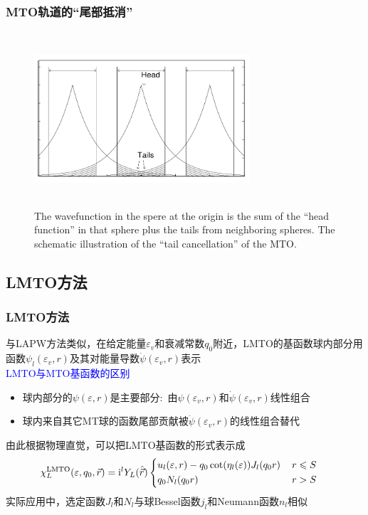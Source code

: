 {\frame
{
	\frametitle{\textrm{MTO}轨道的“尾部抵消”}
\begin{figure}[h!]
	\vspace*{-0.7in}
\centering
\includegraphics[height=2.55in,width=3.15in,viewport=0 0 845 635,clip]{Figures/MTO-Tail_cancellation.png}
\caption{\tiny \textrm{The wavefunction in the spere at the origin is the sum of the ``head function'' in that sphere plus the tails from neighboring spheres. The schematic illustration of the ``tail cancellation'' of the MTO.}}%
\label{MTO-tail-candellation}
\end{figure}
}

\subsection{\rm{LMTO}方法}
\frame
{
	\frametitle{\textrm{LMTO}方法}
	与\textrm{LAPW}方法类似，在给定能量$\varepsilon_v$和衰减常数$q_0$附近，\textrm{LMTO}的基函数球内部分用函数$\psi_l(\varepsilon_v,r)$及其对能量导数$\dot\psi(\varepsilon_v,r)$表示\\
\textcolor{blue}{\textrm{LMTO}与\textrm{MTO}基函数的区别}
	\begin{itemize}
		\item 球内部分的$\psi(\varepsilon,r)$是主要部分:~由$\psi(\varepsilon_v,r)$和$\dot\psi(\varepsilon_v,r)$线性组合
		\item 球内来自其它\textrm{MT}球的函数尾部贡献被$\dot\psi(\varepsilon_v,r)$的线性组合替代
	\end{itemize}
	由此根据物理直觉，可以把\textrm{LMTO}基函数的形式表示成
		\begin{displaymath}
			\hspace*{-12pt}\chi_L^{\mathrm{LMTO}}(\varepsilon,q_0,\vec r)=\mathrm{i}^lY_L(\hat{\vec r})\left\{
			\begin{aligned}
				&u_l(\varepsilon,r)-q_0\cot(\eta_l(\varepsilon))J_l(q_0r)&\, r\leqslant S\\
				&q_0N_l(q_0r)&\, r>S
			\end{aligned}\right.
		\end{displaymath}
		实际应用中，选定函数$J_l$和$N_l$与球\textrm{Bessel}函数$j_l$和\textrm{Neumann}函数$n_l$相似
}

}
